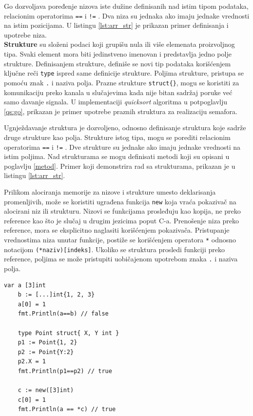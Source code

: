 \documentclass[12pt,oneside]{memoir}
\begin{document}
Go dozvoljava poređenje nizova iste dužine definisanih nad istim tipom podataka, relacionim operatorima \texttt{==} i \texttt{!=} . Dva niza su jednaka ako imaju jednake vrednosti na istim pozicijama. U listingu \ref{lst:arr_str} je prikazan primer definisanja i upotrebe niza.
\\

\textbf{Strukture} su složeni podaci koji grupišu nula ili više elemenata proizvoljnog tipa. Svaki element mora biti jedinstveno imenovan i predstavlja jedno polje strukture. Definisanjem strukture, definiše se novi tip podataka korišćenjem ključne reči \texttt{type} ispred same definicije strukture. Poljima strukture, pristupa se pomoću znak \texttt{.} i naziva polja. Prazne strukture \texttt{struct\{\}}, mogu se koristiti za komunikaciju preko kanala u slučajevima kada nije bitan sadržaj poruke već samo davanje signala. U implementaciji \textit{quicksort} algoritma u potpoglavlju \ref{qs:go}, prikazan je primer upotrebe praznih struktura za realizaciju semafora. 

Ugnježdavanje struktura je dozvoljeno, odnosno definisanje struktura koje sadrže druge strukture kao polja. Strukture istog tipa, mogu se porediti relacionim operatorima   \texttt{==} i \texttt{!=} . Dve strukture su jednake ako imaju jednake vrednosti na istim poljima. Nad strukturama se mogu definisati metodi koji su opisani u poglavlju \ref{metod}. Primer koji demonstrira rad sa strukturama, prikazan je u listingu  \ref{lst:arr_str}.

Prilikom alociranja memorije za nizove i strukture umesto deklarisanja promenljivih, može se koristiti ugrađena funkcija \texttt{new} koja vraća pokazivač na alocirani niz ili strukturu. Nizovi se funkcijama prosleđuju kao kopija, ne preko reference kao što je slučaj u drugim jezicima poput C-a. Prenošenje niza preko reference, mora se eksplicitno naglasiti korišćenjem pokazivača. Pristupanje vrednostima niza unutar funkcije, postiže se korišćenjem operatora \texttt{*} odnosno notacijom \texttt{(*naziv)[indeks]}. Ukoliko se struktura prosledi funkciji preko reference, poljima se može pristupiti uobičajenom upotrebom znaka \texttt{.} i naziva polja.


\begin{center}
\begin{lstlisting}[caption=Primer koji demonstrira rad sa nizovima i strukturama, label={lst:arr_str},  backgroundcolor=\color{background}]
	var a [3]int
	b := [...]int{1, 2, 3}
	a[0] = 1
	fmt.Println(a==b) // false

	type Point struct{ X, Y int }
	p1 := Point{1, 2}
	p2 := Point{Y:2}
	p2.X = 1
	fmt.Println(p1==p2) // true

	c := new([3]int)
	c[0] = 1
	fmt.Println(a == *c) // true			
\end{lstlisting}
\end{center}
\end{document}
